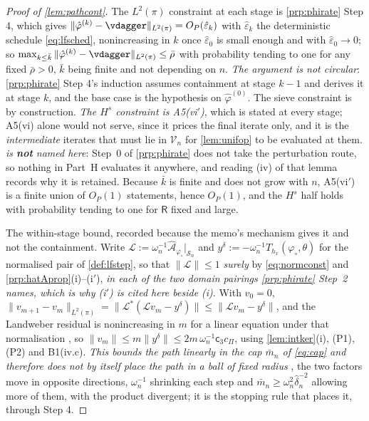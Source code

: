 \begin{proof}[Proof of \cref{lem:pathcont}]
The $L^{2}(\pi)$ constraint at each stage is \cref{prp:phirate} Step 4, which gives
$\|\hat\varphi^{(k)}-\vdagger\|_{L^{2}(\pi)}=O_P(\hat\varepsilon_k)$ with $\hat\varepsilon_k$ the
deterministic schedule \eqref{eq:lfsched}, nonincreasing in $k$ once $\hat\varepsilon_0$ is small
enough and with $\hat\varepsilon_0\to0$; so
$\max_{k\le\bar k}\|\hat\varphi^{(k)}-\vdagger\|_{L^{2}(\pi)}\le\bar\rho$
with probability tending to one for any fixed $\bar\rho>0$, $\bar k$ being finite and not depending on
$n$. \emph{The argument is not circular}: \cref{prp:phirate} Step 4's induction assumes containment at
stage $k-1$ and derives it at stage $k$, and the base case is the hypothesis on $\hat\varphi^{(0)}$.
The sieve constraint is by construction. \emph{The $H^{s}$ constraint is A5(vi$'$)}, which is stated at
every stage; A5(vi) alone would not serve, since it prices the final iterate only, and it is the
\emph{intermediate} iterates that must lie in $\mathcal V_n$ for \cref{lem:unifop} to be evaluated at
them. \emph{ is \textbf{not} named here}: Step~0 of \cref{prp:phirate} does not take the
perturbation route, so nothing in
Part~H evaluates it anywhere, and reading (iv) of that lemma records why it is retained.
Because $\bar k$ is finite and does not grow with $n$,
A5(vi$'$) is a finite union of $O_P(1)$ statements, hence $O_P(1)$, and the $H^{s}$ half holds with
probability tending to one for $\mathsf R$ fixed and large.

The within-stage bound, recorded because the memo's mechanism gives it and not the containment.
Write $\mathcal L:=\omega_n^{-1}\hat{\mathcal A}_{\varphi_\circ}\vert_{\mathcal S_n}$ and
$y^\delta:=-\omega_n^{-1}\hat T_{h_x}(\varphi_\circ,\theta)$ for the normalised pair of
\cref{def:lfstep}, so that $\|\mathcal L\|\le1$ \emph{surely} by \eqref{eq:normconst} and
\cref{prp:hatAprop}(i)--(i$'$), \emph{in each of the two domain pairings
\cref{prp:phirate} Step~2 names, which is why (i$'$) is cited here beside (i)}. With $v_0=0$,
$\|v_{m+1}-v_m\|_{L^{2}(\pi)}=\|\mathcal L^{\ast}(\mathcal Lv_m-y^\delta)\|\le\|\mathcal Lv_m-y^\delta\|$,
and the Landweber residual is nonincreasing in $m$ for a linear equation under that normalisation
\citep[Ch.~6]{engl2000}, so
$\|v_m\|\le m\|y^\delta\|\le 2m\,\omega_n^{-1}\mathsf c_3c_\Pi$, using
\cref{lem:intker}(i), (P1), (P2) and B1(iv.c). \emph{This bounds the path linearly in the cap
$\bar m_n$ of \eqref{eq:cap} and therefore does not by itself place the path in a ball of fixed radius}
, the two factors move in opposite directions, $\omega_n^{-1}$ shrinking each step and
$\bar m_n\ge\omega_n^{2}\hat\delta_n^{-2}$ allowing more of them, with the product divergent; it is
the stopping rule that places it, through Step 4.
\end{proof}

